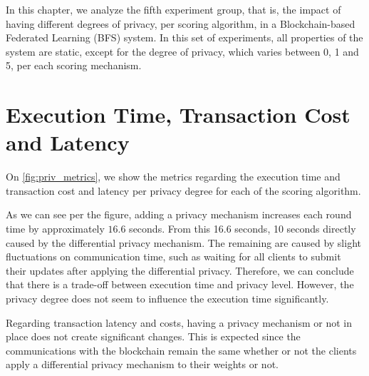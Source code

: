 In this chapter, we analyze the fifth experiment group, that is, the impact of having different degrees of privacy, per scoring algorithm, in a Blockchain-based Federated Learning (BFS) system. In this set of experiments, all properties of the system are static, except for the degree of privacy, which varies between 0, 1 and 5, per each scoring mechanism.

\section{Execution Time, Transaction Cost and Latency}

On \autoref{fig:priv_metrics}, we show the metrics regarding the execution time and transaction cost and latency per privacy degree for each of the scoring algorithm.

As we can see per the figure, adding a privacy mechanism increases each round time by approximately $16.6$ seconds. From this 16.6 seconds, 10 seconds directly caused by the differential privacy mechanism. The remaining are caused by slight fluctuations on communication time, such as waiting for all clients to submit their updates after applying the differential privacy. Therefore, we can conclude that there is a trade-off between execution time and privacy level. However, the privacy degree does not seem to influence the execution time significantly.

Regarding transaction latency and costs, having a privacy mechanism or not in place does not create significant changes. This is expected since the communications with the blockchain remain the same whether or not the clients apply a differential privacy mechanism to their weights or not. 

